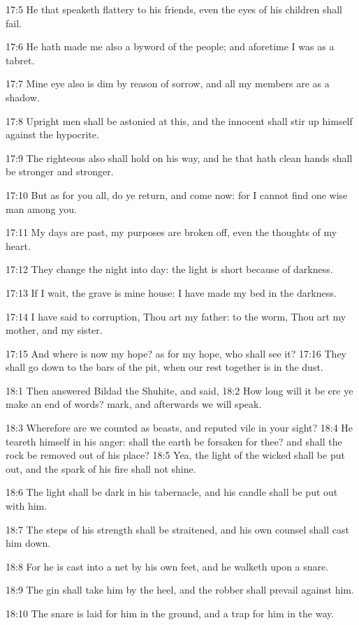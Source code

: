 17:5 He that speaketh flattery to his friends, even the eyes of his children shall fail.

17:6 He hath made me also a byword of the people; and aforetime I was as a tabret.

17:7 Mine eye also is dim by reason of sorrow, and all my members are as a shadow.

17:8 Upright men shall be astonied at this, and the innocent shall stir up himself against the hypocrite.

17:9 The righteous also shall hold on his way, and he that hath clean hands shall be stronger and stronger.

17:10 But as for you all, do ye return, and come now: for I cannot find one wise man among you.

17:11 My days are past, my purposes are broken off, even the thoughts of my heart.

17:12 They change the night into day: the light is short because of darkness.

17:13 If I wait, the grave is mine house: I have made my bed in the darkness.

17:14 I have said to corruption, Thou art my father: to the worm, Thou art my mother, and my sister.

17:15 And where is now my hope? as for my hope, who shall see it?  17:16 They shall go down to the bars of the pit, when our rest together is in the dust.

18:1 Then answered Bildad the Shuhite, and said, 18:2 How long will it be ere ye make an end of words? mark, and afterwards we will speak.

18:3 Wherefore are we counted as beasts, and reputed vile in your sight?  18:4 He teareth himself in his anger: shall the earth be forsaken for thee? and shall the rock be removed out of his place?  18:5 Yea, the light of the wicked shall be put out, and the spark of his fire shall not shine.

18:6 The light shall be dark in his tabernacle, and his candle shall be put out with him.

18:7 The steps of his strength shall be straitened, and his own counsel shall cast him down.

18:8 For he is cast into a net by his own feet, and he walketh upon a snare.

18:9 The gin shall take him by the heel, and the robber shall prevail against him.

18:10 The snare is laid for him in the ground, and a trap for him in the way.

